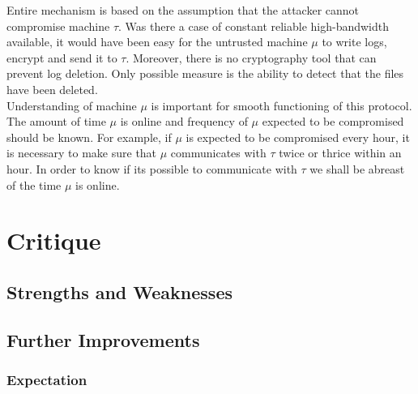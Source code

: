\documentclass[12pt, letter]{article}
\begin{document}
Entire mechanism is based on the assumption that the attacker cannot compromise machine $\tau$. Was there a case of constant reliable high-bandwidth available, it would have been easy for the untrusted machine $\mu$ to write logs, encrypt and send it to $\tau$. Moreover, there is no cryptography tool that can prevent log deletion. Only possible measure is the ability to detect that the files have been deleted.\\

Understanding of machine $\mu$ is important for smooth functioning of this protocol. The amount of time $\mu$ is online and frequency of $\mu$ expected to be compromised should be known. For example, if $\mu$ is expected to be compromised every hour, it is necessary to make sure that $\mu$ communicates with $\tau$ twice or thrice within an hour. In order to know if its possible to communicate with $\tau$ we shall be abreast of the time $\mu$ is online.

\section{Critique}

\blindtext

\subsection{Strengths and Weaknesses}

\blindtext

\subsection{Further Improvements}

\blindtext

\subsubsection{Expectation}
\end{document}

